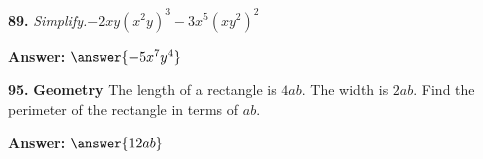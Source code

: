 \documentclass{ximera}
\begin{document}
\begin{problem}
\textbf{89.} \emph{Simplify.}\quad $-2xy(x^2y)^3 - 3x^5(xy^2)^2$

\textbf{Answer:} $\answer{-5x^7y^4}$
\end{problem}

\begin{problem}
\textbf{95.} \textbf{Geometry} The length of a rectangle is $4ab$. The width is $2ab$. Find the
  perimeter of the rectangle in terms of $ab$.

\textbf{Answer:} $\answer{12ab}$
\end{problem}
\end{document}
